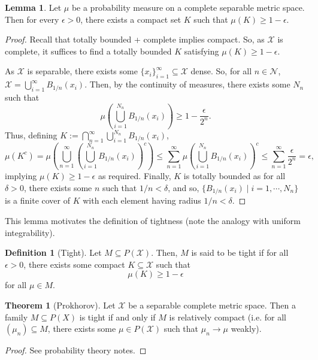 \documentclass[]{article}
\theoremstyle{definition}
\newtheorem{theorem}{Theorem}
\theoremstyle{definition}
\newtheorem{definition}{Definition}[section]
\newtheorem{lemma}{Lemma}[section]
\begin{document}
\begin{lemma}
  Let \(\mu\) be a probability measure on a complete separable metric space. Then 
  for every \(\epsilon > 0\), there exists a compact set \(K\) such that 
  \(\mu(K) \ge 1 - \epsilon\).
\end{lemma}
\begin{proof}
  Recall that totally bounded + complete implies compact. So, as \(\mathcal{X}\) 
  is complete, it suffices to find a totally bounded \(K\) satisfying 
  \(\mu(K) \ge 1 - \epsilon\).

  As \(\mathcal{X}\) is separable, there exists some 
  \(\{x_i\}_{i = 1}^\infty \subseteq \mathcal{X}\) dense. So, for all \(n \in \mathcal{N}\), 
  \(\mathcal{X} = \bigcup_{i = 1}^\infty B_{1 / n}(x_i)\). Then, by the continuity 
  of measures, there exists some \(N_n\) such that 
  \[\mu\left(\bigcup_{i = 1}^{N_n} B_{1 / n}(x_i)\right) \ge 1 - \frac{\epsilon}{2^n}.\]
  Thus, defining \(K := \bigcap_{n = 1}^\infty \bigcup_{i = 1}^{N_n} B_{1 / n}(x_i)\),
  \[\mu(K^c) = \mu\left(\bigcup_{n = 1}^\infty \left(\bigcup_{i = 1}^{N_n} B_{1 / n}(x_i)\right)^c\right)
    \le \sum_{n = 1}^\infty \mu\left(\bigcup_{i = 1}^{N_n} B_{1 / n}(x_i)\right)^c
    \le \sum_{n = 1}^\infty \frac{\epsilon}{2^n} = \epsilon,\]
  implying \(\mu(K) \ge 1 - \epsilon\) as required. Finally, \(K\) is totally bounded 
  as for all \(\delta > 0\), there exists some \(n\) such that \(1 / n < \delta\), 
  and so, \(\{B_{1 / n}(x_i) \mid i = 1, \cdots, N_n\}\) is a finite cover of 
  \(K\) with each element having radius \(1 / n < \delta\).
\end{proof}

This lemma motivates the definition of tightness (note the analogy with uniform 
integrability).

\begin{definition}[Tight]
  Let \(M \subseteq P(\mathcal{X})\). Then, \(M\) is said to be tight if for 
  all \(\epsilon > 0\), there exists some compact \(K \subseteq \mathcal{X}\) 
  such that 
  \[\mu(K) \ge 1 - \epsilon\]
  for all \(\mu \in M\).
\end{definition}

\begin{theorem}[Prokhorov]
  Let \(\mathcal{X}\) be a separable complete metric space. Then a family 
  \(M \subseteq P(X)\) is tight if and only if \(M\) is relatively compact
  (i.e. for all \((\mu_n) \subseteq M\), there exists some \(\mu \in P(\mathcal{X})\)
  such that \(\mu_n \to \mu\) weakly). 
\end{theorem}
\begin{proof}
  See probability theory notes.
\end{proof}
\end{document}
